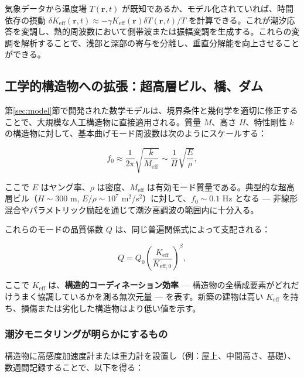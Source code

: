 \documentclass[12pt,a4paper]{article}
\theoremstyle{remark}
\newcommand{\Keff}{K_{\mathrm{eff}}}
\begin{document}
	気象データから温度場 \(T(\mathbf{r},t)\) が既知であるか、モデル化されていれば、時間依存の摂動 \(\delta \Keff(\mathbf{r},t) \approx -\gamma \Keff(\mathbf{r}) \delta T(\mathbf{r},t)/T\) を計算できる。これが潮汐応答を変調し、熱的周波数において側帯波または振幅変調を生成する。これらの変調を解析することで、浅部と深部の寄与を分離し、垂直分解能を向上させることができる。
	
	\subsection{工学的構造物への拡張：超高層ビル、橋、ダム}
	\label{sec:structures}
	
	第\ref{sec:model}節で開発された数学モデルは、境界条件と幾何学を適切に修正することで、大規模な人工構造物に直接適用される。質量 \(M\)、高さ \(H\)、特性剛性 \(k\) の構造物に対して、基本曲げモード周波数は次のようにスケールする：
	
	\begin{equation}
		f_0 \approx \frac{1}{2\pi} \sqrt{\frac{k}{M_{\mathrm{eff}}}} \sim \frac{1}{H} \sqrt{\frac{E}{\rho}},
		\label{eq:structural-frequency}
	\end{equation}
	
	ここで \(E\) はヤング率、\(\rho\) は密度、\(M_{\mathrm{eff}}\) は有効モード質量である。典型的な超高層ビル（\(H \sim 300\) m, \(E/\rho \sim 10^7\) m\(^2\)/s\(^2\)）に対して、\(f_0 \sim 0.1\) Hz となる — 非線形混合やパラメトリック励起を通じて潮汐高調波の範囲内に十分入る。
	
	これらのモードの品質係数 \(Q\) は、同じ普遍関係式によって支配される：
	
	\begin{equation}
		Q = Q_0 \left( \frac{K_{\mathrm{eff}}}{K_{\mathrm{eff},0}} \right)^{\beta},
		\label{eq:structural-Q}
	\end{equation}
	
	ここで \(K_{\mathrm{eff}}\) は、\textbf{構造的コーディネーション効率} — 構造物の全構成要素がどれだけうまく協調しているかを測る無次元量 — を表す。新築の建物は高い \(K_{\mathrm{eff}}\) を持ち、損傷または劣化した構造物はより低い値を示す。
	
	\subsubsection{潮汐モニタリングが明らかにするもの}
	
	構造物に高感度加速度計または重力計を設置し（例：屋上、中間高さ、基礎）、数週間記録することで、以下を得る：
	
\end{document}
